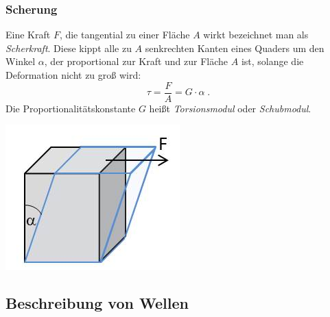 \subsubsection{Scherung}

\begin{minipage}[b]{0.64\textwidth}
Eine Kraft $F$, die tangential zu einer Fläche $A$ wirkt bezeichnet man als \textit{Scherkraft}. Diese kippt alle zu $A$ senkrechten Kanten eines Quaders um den Winkel $\alpha$, der proportional zur Kraft und zur Fläche $A$ ist, solange die Deformation nicht zu groß wird:
\begin{equation}
	\tau = \frac{F}{A} = G\cdot \alpha\; .
\end{equation}
Die Proportionalitätskonstante $G$ heißt \textit{Torsionsmodul} oder \textit{Schubmodul}.
\end{minipage}
\hfill
\begin{minipage}[b]{0.30\textwidth}
	\includegraphics[width=.8\textwidth]{Versuch_neu_1-2/figures/Scherung.jpg}
	\label{fig:Scherung}
\end{minipage}


\subsection{Beschreibung von Wellen}

